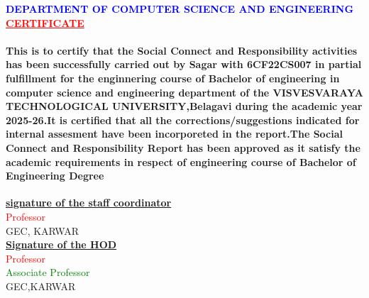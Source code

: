 \documentclass[a4paper,15pt]{article}
\begin{document}
\textcolor{blue}{\textbf{DEPARTMENT OF COMPUTER SCIENCE AND
ENGINEERING}}\\
\vspace{5mm}
\centering
\vspace{5mm}
\textcolor{red}{\underline{\textbf{CERTIFICATE}}}\\
\paragraph{
This is to certify that the Social Connect and Responsibility activities has been
successfully carried out by Sagar with 6CF22CS007 in partial fulfillment for the
enginnering course of Bachelor of engineering in computer science and engineering
department of the VISVESVARAYA TECHNOLOGICAL UNIVERSITY,Belagavi during the
academic year 2025-26.It is certified that all the corrections/suggestions indicated
for internal assesment have been incorporeted in the report.The Social Connect and
Responsibility Report has been approved as it satisfy the academic requirements in
respect of engineering course of Bachelor of Engineering Degree}
\begin{center}
\centering
\vspace{5mm}
\underline{\textbf{signature of the staff coordinator}}\\
\vspace{10mm}
\textcolor{red}{Professor}\\
GEC, KARWAR\\
\vspace{12mm}
\centering
\underline{\textbf{Signature of the HOD}}\\
\vspace{10mm}
\textcolor{red}{Professor}\\
\textcolor{green}{Associate Professor}\\
GEC,KARWAR
\end{center}
\end{document}
